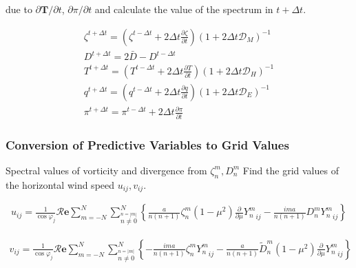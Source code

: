 due to \(\partial \mathbf{T}/\partial t\), \(\partial \pi/\partial t\)
and calculate the value of the spectrum in \(t+\Delta t\).

\begin{eqnarray}
  \zeta^{t+\Delta t}  =  \left( \zeta^{t-\Delta t}
                                +   2 \Delta t \frac{\partial \zeta}{\partial t} \right)
                          ( 1 + 2 \Delta t {\mathcal D}_M )^{-1} \\
  D^{t+\Delta t}  =  2 \bar{D} - D^{t-\Delta t}\\
  T^{t+\Delta t}  =  \left( T^{t-\Delta t}
                                +  2 \Delta t  \frac{\partial T}{\partial t} \right)
                          ( 1 + 2 \Delta t {\mathcal D}_H )^{-1} \\
  q^{t+\Delta t}  =  \left( q^{t-\Delta t}
                                +  2 \Delta t \frac{\partial q}{\partial t} \right)
                          ( 1 + 2 \Delta t {\mathcal D}_E )^{-1} \\
\pi^{t+\Delta t}  =  \pi^{t-\Delta t}
                                +  2 \Delta t \frac{\partial \pi}{\partial t}
\end{eqnarray}

\hypertarget{conversion-of-predictive-variables-to-grid-values}{%
\subsubsection{Conversion of Predictive Variables to Grid
Values}\label{conversion-of-predictive-variables-to-grid-values}}

Spectral values of vorticity and divergence from \(\zeta_n^m, D_n^m\)
Find the grid values of the horizontal wind speed \(u_{ij}, v_{ij}\).

\begin{eqnarray}
  u_{ij}
  =  \frac{1}{\cos \varphi_j}
     {\mathcal R}\mathbf{e} \sum_{m=-N}^{N}
                       \sum_{\stackrel{n=|m|}{n \neq 0}}^{N}
    \left\{
             \frac{a}{n(n+1)} \zeta_n^m
            (1-\mu^{2}) \frac{\partial }{\partial \mu} {Y_n^m}_{ij}
          -  \frac{im a}{n(n+1)} D_n^m {Y_n^m}_{ij}
    \right\}
\end{eqnarray}

\begin{eqnarray}
  v_{ij}
  =  \frac{1}{\cos \varphi_j}
     {\mathcal R}\mathbf{e} \sum_{m=-N}^{N}
                       \sum_{\stackrel{n=|m|}{n \neq 0}}^{N}
    \left\{
          -  \frac{im a}{n(n+1)} \zeta_n^m  {Y_n^m}_{ij}
          -  \frac{a}{n(n+1)} \tilde{D}_n^m
            (1-\mu^{2}) \frac{\partial }{\partial \mu} {Y_n^m}_{ij}
    \right\}
\end{eqnarray}


